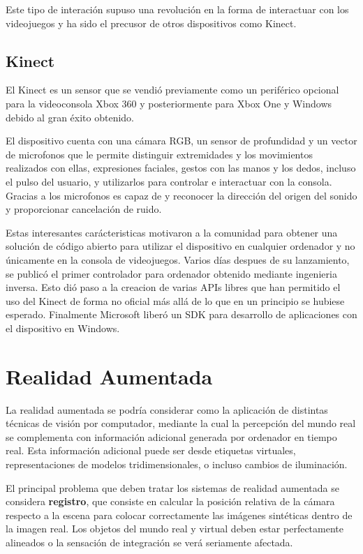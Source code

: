 Este tipo de interación supuso una revolución en la forma de interactuar con los videojuegos y ha sido el precusor de otros dispositivos como Kinect.

\subsection{Kinect}
El Kinect es un sensor que se vendió previamente como un periférico opcional para la videoconsola Xbox 360 y posteriormente para Xbox One y Windows debido al gran éxito obtenido.

El dispositivo cuenta con una cámara RGB, un sensor de profundidad y un vector de microfonos que le permite distinguir extremidades y los movimientos realizados con ellas, expresiones faciales, gestos con las manos y los dedos, incluso el pulso del usuario, y utilizarlos para controlar e interactuar con la consola. Gracias a los microfonos es capaz de y reconocer la dirección del origen del sonido y proporcionar cancelación de ruido.

Estas interesantes carácteristicas motivaron a la comunidad para obtener una solución de código abierto para utilizar el dispositivo en cualquier ordenador y no únicamente en la consola de videojuegos. Varios días despues de su lanzamiento, se publicó el primer controlador para ordenador obtenido mediante ingenieria inversa. Esto dió paso a  la creacion de varias APIs libres que han permitido el uso del Kinect de forma no oficial más allá de lo que en un principio se hubiese esperado. Finalmente Microsoft liberó un SDK para desarrollo de aplicaciones con el dispositivo en Windows.  

\section{Realidad Aumentada}
La realidad aumentada se podría considerar como la aplicación de distintas técnicas de visión por computador, mediante la cual la percepción del mundo real se complementa con información adicional generada por ordenador en tiempo real. Esta información adicional puede ser desde etiquetas virtuales, representaciones de modelos tridimensionales, o incluso cambios de iluminación. 

El principal problema que deben tratar los sistemas de realidad aumentada se considera \textbf{registro}, que consiste en calcular la posición relativa de la cámara respecto a la escena para colocar correctamente las imágenes sintéticas dentro de la imagen real. Los objetos del mundo real y virtual deben estar perfectamente alineados o la sensación de integración se verá seriamente afectada.

